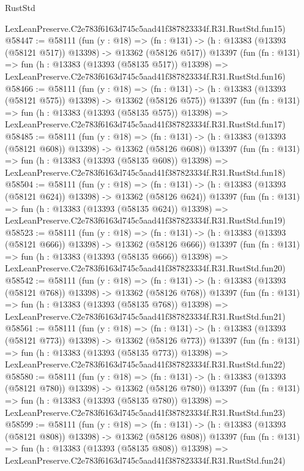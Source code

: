 \begin{lexlean}{RustStd}
\begin{coremodule}
    LexLeanPreserve.C2e783f6163d745c5aad41f387823334f.R31.RustStd.fun15)
@58447 := @58111
    (fun (y : @18) =>
    (fn : @131) -> (h : @13383 (@13393 (@58121 @517)) @13398) -> @13362 (@58126 @517))
    @13397
    (fun (fn : @131) =>
    fun (h : @13383 (@13393 (@58135 @517)) @13398) =>
    LexLeanPreserve.C2e783f6163d745c5aad41f387823334f.R31.RustStd.fun16)
@58466 := @58111
    (fun (y : @18) =>
    (fn : @131) -> (h : @13383 (@13393 (@58121 @575)) @13398) -> @13362 (@58126 @575))
    @13397
    (fun (fn : @131) =>
    fun (h : @13383 (@13393 (@58135 @575)) @13398) =>
    LexLeanPreserve.C2e783f6163d745c5aad41f387823334f.R31.RustStd.fun17)
@58485 := @58111
    (fun (y : @18) =>
    (fn : @131) -> (h : @13383 (@13393 (@58121 @608)) @13398) -> @13362 (@58126 @608))
    @13397
    (fun (fn : @131) =>
    fun (h : @13383 (@13393 (@58135 @608)) @13398) =>
    LexLeanPreserve.C2e783f6163d745c5aad41f387823334f.R31.RustStd.fun18)
@58504 := @58111
    (fun (y : @18) =>
    (fn : @131) -> (h : @13383 (@13393 (@58121 @624)) @13398) -> @13362 (@58126 @624))
    @13397
    (fun (fn : @131) =>
    fun (h : @13383 (@13393 (@58135 @624)) @13398) =>
    LexLeanPreserve.C2e783f6163d745c5aad41f387823334f.R31.RustStd.fun19)
@58523 := @58111
    (fun (y : @18) =>
    (fn : @131) -> (h : @13383 (@13393 (@58121 @666)) @13398) -> @13362 (@58126 @666))
    @13397
    (fun (fn : @131) =>
    fun (h : @13383 (@13393 (@58135 @666)) @13398) =>
    LexLeanPreserve.C2e783f6163d745c5aad41f387823334f.R31.RustStd.fun20)
@58542 := @58111
    (fun (y : @18) =>
    (fn : @131) -> (h : @13383 (@13393 (@58121 @768)) @13398) -> @13362 (@58126 @768))
    @13397
    (fun (fn : @131) =>
    fun (h : @13383 (@13393 (@58135 @768)) @13398) =>
    LexLeanPreserve.C2e783f6163d745c5aad41f387823334f.R31.RustStd.fun21)
@58561 := @58111
    (fun (y : @18) =>
    (fn : @131) -> (h : @13383 (@13393 (@58121 @773)) @13398) -> @13362 (@58126 @773))
    @13397
    (fun (fn : @131) =>
    fun (h : @13383 (@13393 (@58135 @773)) @13398) =>
    LexLeanPreserve.C2e783f6163d745c5aad41f387823334f.R31.RustStd.fun22)
@58580 := @58111
    (fun (y : @18) =>
    (fn : @131) -> (h : @13383 (@13393 (@58121 @780)) @13398) -> @13362 (@58126 @780))
    @13397
    (fun (fn : @131) =>
    fun (h : @13383 (@13393 (@58135 @780)) @13398) =>
    LexLeanPreserve.C2e783f6163d745c5aad41f387823334f.R31.RustStd.fun23)
@58599 := @58111
    (fun (y : @18) =>
    (fn : @131) -> (h : @13383 (@13393 (@58121 @808)) @13398) -> @13362 (@58126 @808))
    @13397
    (fun (fn : @131) =>
    fun (h : @13383 (@13393 (@58135 @808)) @13398) =>
    LexLeanPreserve.C2e783f6163d745c5aad41f387823334f.R31.RustStd.fun24)

\end{coremodule}
\end{lexlean}
